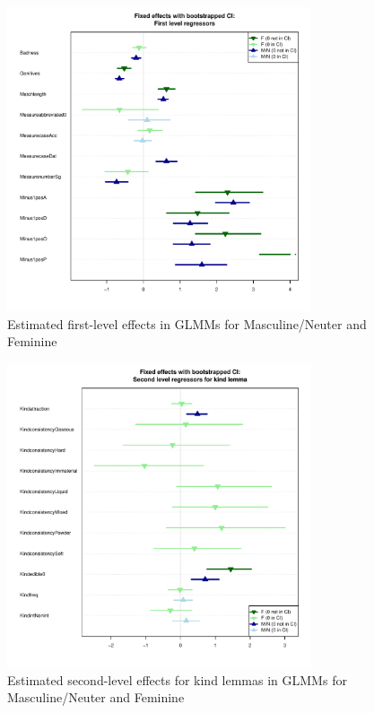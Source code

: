 \documentclass[USenglish]{article}
\begin{document}
\begin{figure}[h]
\centering
\includegraphics[width=0.8\textwidth]{figures/corpus/04_glmm_fixef_firstlevel}
\caption{Estimated first-level effects in GLMMs for Masculine\slash Neuter and Feminine}
\label{fig:glmmfixef}
\end{figure}

\begin{figure}[h]
\centering
\includegraphics[width=0.8\textwidth]{figures/corpus/04_glmm_fixef_secondlevel_kind}
\caption{Estimated second-level effects for kind lemmas in GLMMs for Masculine\slash Neuter and Feminine}
\label{fig:glmmfixef}
\end{figure}
\end{document}
